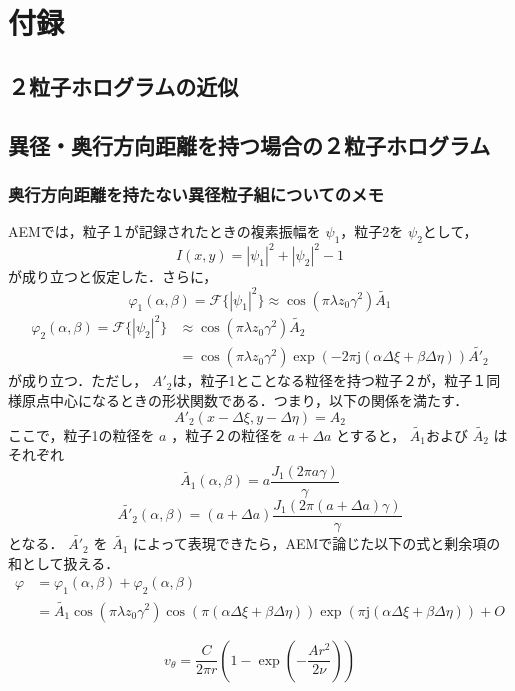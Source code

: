 \appendix
\section*{付録}

\renewcommand{\thesubsection}{\Alph{subsection}}
\subsection{２粒子ホログラムの近似}
\label{sec:appendix_2particle}

\subsection{異径・奥行方向距離を持つ場合の２粒子ホログラム}
\label{sec:appendix_deviation}


\subsubsection{奥行方向距離を持たない異径粒子組についてのメモ}
AEMでは，粒子１が記録されたときの複素振幅を $\psi_1$，粒子2を $\psi_2$として，
\begin{equation}
    I(x,y) = |\psi_1|^2 + |\psi_2|^2 -1
\end{equation}
が成り立つと仮定した．さらに，
\begin{equation}
    \varphi_1(\alpha,\beta) = \mathcal{F}\{|\psi_1|^2\} \approx \cos{(\pi \lambda z_0 \gamma^2)} \tilde{A_1}
\end{equation}
\begin{align}
    \varphi_2(\alpha,\beta) = \mathcal{F}\{|\psi_2|^2\} &\approx \cos{(\pi \lambda z_0 \gamma^2)} \tilde{A_2} \\
    &= \cos{(\pi \lambda z_0 \gamma^2)} \exp{(-2\pi \mathrm{j} (\alpha \Delta \xi + \beta \Delta \eta))} \tilde{A'_2}
\end{align}
が成り立つ．ただし， $A'_2$は，粒子1とことなる粒径を持つ粒子２が，粒子１同様原点中心になるときの形状関数である．つまり，以下の関係を満たす．
\begin{equation}
    A'_2(x-\Delta \xi, y- \Delta \eta ) = A_2
\end{equation}
ここで，粒子1の粒径を $a$ ，粒子２の粒径を $a+\Delta a$ とすると， $\tilde{A_1}$および $\tilde{A_2}$ はそれぞれ
\begin{equation}
    \tilde{A_1}(\alpha,\beta) = a \frac{J_1(2\pi a \gamma)}{\gamma}
\end{equation}
\begin{equation}
    \tilde{A'_2}(\alpha,\beta) = (a+ \Delta a) \frac{J_1(2\pi (a + \Delta a) \gamma)}{\gamma}
\end{equation}
となる． $\tilde{A'_2}$ を $\tilde{A_1}$ によって表現できたら，AEMで論じた以下の式と剰余項の和として扱える．
\begin{align}
    \varphi &= \varphi_1(\alpha,\beta) + \varphi_2(\alpha,\beta) \\
    &= \tilde{A_1} \cos{(\pi \lambda z_0 \gamma^2) \cos{(\pi  (\alpha \Delta \xi + \beta \Delta \eta))}}\exp{(\pi \mathrm{j} (\alpha \Delta \xi + \beta \Delta \eta))} + O
\end{align}

\begin{equation}
    v_{\theta} = \frac{C}{2\pi r} \left( 1- \exp{\left(-\frac{Ar^2}{2\nu}\right)} \right)
\end{equation}